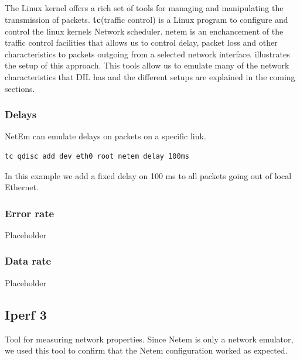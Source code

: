 \subsection{}

The Linux kernel offers a rich set of tools for managing and manipulating the
transmission of packets. \textbf{tc}(traffic control) is a Linux program to
configure and control the linux kernels Network scheduler. \gls{netem} is an
enchancement of the traffic control facilities that allows us to control delay,
packet loss and other characteristics to packets outgoing from a selected
network interface.  illustrates the setup of
this approach. This tools allow us to emulate many of the network
characteristics that DIL has and the different setups are explained in the
coming sections.




\subsubsection{Delays}

NetEm can emulate delays on packets on a specific link.

\begin{lstlisting}[frame=single, caption="Emulating delay"]
  tc qdisc add dev eth0 root netem delay 100ms
\end{lstlisting}

In this example we add a fixed delay on 100 ms to all packets going out of local
Ethernet.

\subsubsection{Error rate}
Placeholder

\subsubsection{Data rate}
Placeholder

\subsection{Iperf 3}

Tool for measuring network properties. Since Netem is only a network emulator,
we used this tool to confirm that the Netem configuration worked as expected.

